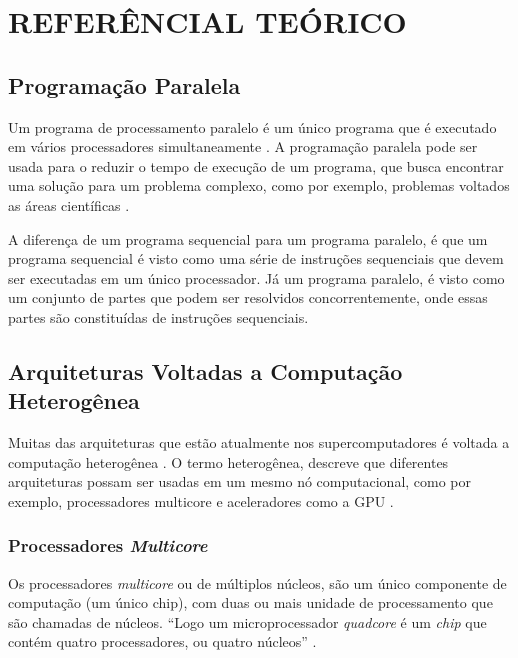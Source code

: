 
\chapter{REFERÊNCIAL TEÓRICO}
\label{chap:ref-teorico}

\section{Programação Paralela}

Um programa de processamento paralelo é um único programa que é executado em vários processadores simultaneamente \cite{hennessy2014organizaccao}. 
A programação paralela pode ser usada para o reduzir o tempo de execução de um programa,
que busca encontrar uma solução para um problema complexo, como por exemplo, problemas voltados as áreas científicas \cite{hennessy2014organizaccao}.

A diferença de um programa sequencial para um programa paralelo, é que um programa sequencial é visto como uma série de instruções
sequenciais que devem ser executadas em um único processador.
Já um programa paralelo, é visto como um conjunto de partes que podem ser resolvidos concorrentemente,
onde essas partes são constituídas de instruções sequenciais. \cite{hennessy2014organizaccao,tanenbaum20103a}

\section{Arquiteturas Voltadas a Computação Heterogênea}
Muitas das arquiteturas que estão atualmente nos supercomputadores é voltada a computação heterogênea \cite{meuer2014top500}.
O termo heterogênea, descreve que diferentes arquiteturas possam ser usadas em um mesmo nó computacional, como por exemplo, processadores multicore e aceleradores como a GPU \cite{intrArqHete:2012}.

\subsection{Processadores \textit{Multicore}}
Os processadores \textit{multicore} ou de múltiplos núcleos, são um único componente de computação (um único chip), com duas ou mais unidade de processamento que são chamadas de núcleos. \cite{blake2009survey}
“Logo um microprocessador \textit{quadcore} é um \textit{chip} que contém quatro processadores, ou quatro núcleos” \cite[p.~31]{hennessy2014organizaccao}.

